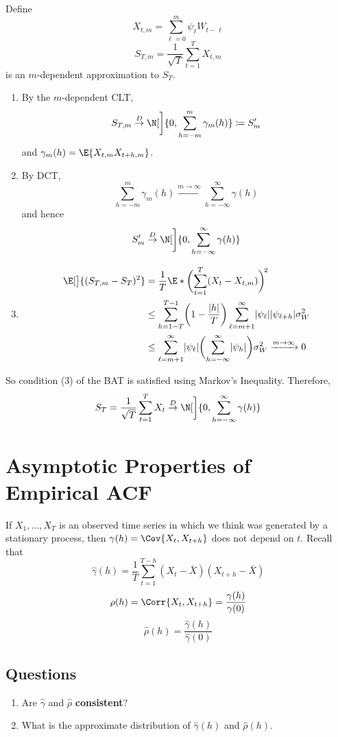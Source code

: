 \begin{Proof}{}{}
    Define
    \[ X_{t,m}=\sum_{\ell=0}^{m} \psi_\ell W_{t-\ell} \]
    \[ S_{T,m}=\frac{1}{\sqrt{T}} \sum_{t=1}^{T} X_{t,m} \]
    is an $ m $-dependent approximation to $ S_T $.
    \begin{enumerate}[(1)]
        \item By the $ m $-dependent CLT,
              \[ S_{T,m}\stackrel{D}{\to}\N[\bigg]{0,\sum_{h=-m}^{m} \gamma_m(h)}\coloneq
                  S_m^\prime \]
              and $ \gamma_m(h)=\E{X_{t,m}X_{t+h,m}} $.
        \item By DCT,
              \[ \sum_{h=-m}^{m} \gamma_m(h)
                  \xrightarrow{m\to\infty}\sum_{h=-\infty}^{\infty} \gamma(h) \]
              and hence
              \[ S_m^\prime\stackrel{D}{\to}\N[\bigg]{0,\sum_{h=-\infty}^{\infty} \gamma(h)} \]
        \item \begin{align*}
                  \E[\big]{(S_{T,m}-S_T)^2}
                   & =\frac{1}{T} \E*{\biggl(\sum_{t=1}^{T}(X_t-X_{t,m}) \biggr)^{\!2}} \\
                   & \le \sum_{h=1-T}^{T-1} \biggl(1-\frac{\abs{h}}{T} \biggr)
                  \sum_{\ell=m+1}^{\infty}\abs{\psi_\ell}\abs{\psi_{\ell+h}}\sigma_W^2  \\
                   & \le \sum_{\ell=m+1}^{\infty} \abs{\psi_\ell}
                  \biggl(\sum_{h=-\infty}^{\infty} \abs{\psi_h}\biggr)\sigma_W^2\xrightarrow{m\to\infty}0
              \end{align*}
    \end{enumerate}
    So condition (3) of the BAT is satisfied using Markov's Inequality. Therefore,
    \[ S_T=\frac{1}{\sqrt{T}}\sum_{t=1}^{T} X_t\stackrel{D}{\to}\N[\bigg]{0,\sum_{h=-\infty}^{\infty} \gamma(h)}  \]
\end{Proof}
\section{Asymptotic Properties of Empirical ACF}
If $ X_1,\ldots,X_T $ is an observed time series in
which we think was generated by a stationary process, then
$ \gamma(h)=\Cov{X_t,X_{t+h}} $ does not depend on $ t $. Recall that
\[ \hat{\gamma}(h)=\frac{1}{T} \sum_{t=1}^{T-h}(X_t-\bar{X})(X_{t+h}-\bar{X}) \]
\[ \rho(h)=\Corr{X_t,X_{t+h}}=\frac{\gamma(h)}{\gamma(0)} \]
\[ \hat{\rho}(h)=\frac{\hat{\gamma}(h)}{\hat{\gamma}(0)}  \]
\subsection*{Questions}
\begin{enumerate}[(1)]
    \item Are $ \hat{\gamma} $ and $ \hat{\rho} $ \textbf{consistent}?
    \item What is the approximate distribution of $ \hat{\gamma}(h) $
          and $ \hat{\rho}(h) $.
\end{enumerate}
